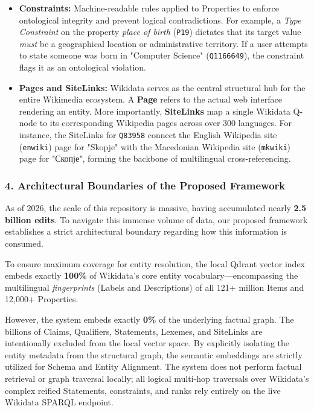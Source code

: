 \begin{itemize}
    \item \textbf{Constraints:} Machine-readable rules applied to Properties to enforce ontological integrity and prevent logical contradictions. For example, a \textit{Type Constraint} on the property \textit{place of birth} (\texttt{P19}) dictates that its target value \textit{must} be a geographical location or administrative territory. If a user attempts to state someone was born in "Computer Science" (\texttt{Q1166649}), the constraint flags it as an ontological violation.
    
    \item \textbf{Pages and SiteLinks:} Wikidata serves as the central structural hub for the entire Wikimedia ecosystem. A \textbf{Page} refers to the actual web interface rendering an entity. More importantly, \textbf{SiteLinks} map a single Wikidata Q-node to its corresponding Wikipedia pages across over 300 languages. For instance, the SiteLinks for \texttt{Q83958} connect the English Wikipedia site (\texttt{enwiki}) page for "Skopje" with the Macedonian Wikipedia site (\texttt{mkwiki}) page for "Скопје", forming the backbone of multilingual cross-referencing.
\end{itemize}

\subsubsection*{4. Architectural Boundaries of the Proposed Framework}
As of 2026, the scale of this repository is massive, having accumulated nearly \textbf{2.5 billion edits}. To navigate this immense volume of data, our proposed framework establishes a strict architectural boundary regarding how this information is consumed. 

To ensure maximum coverage for entity resolution, the local Qdrant vector index embeds exactly \textbf{100\%} of Wikidata's core entity vocabulary—encompassing the multilingual \textit{fingerprints} (Labels and Descriptions) of all 121+ million Items and 12,000+ Properties. 

However, the system embeds exactly \textbf{0\%} of the underlying factual graph. The billions of Claims, Qualifiers, Statements, Lexemes, and SiteLinks are intentionally excluded from the local vector space. By explicitly isolating the entity metadata from the structural graph, the semantic embeddings are strictly utilized for Schema and Entity Alignment. The system does not perform factual retrieval or graph traversal locally; all logical multi-hop traversals over Wikidata's complex reified Statements, constraints, and ranks rely entirely on the live Wikidata SPARQL endpoint.
